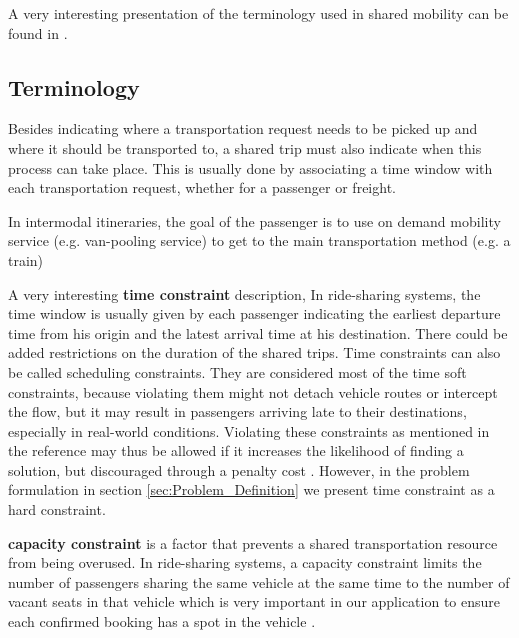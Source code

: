 \documentclass{article}
\begin{document}
A very interesting presentation of the terminology used in shared mobility can be found in\cite{hyland_taxonomy} \cite{MOURAD2019}  \cite{Schnee2009}.

\subsection{Terminology}

Besides indicating where a transportation request needs to be picked up and where it should be transported to, a shared trip must also indicate when this process can take place. 
This is usually done by associating a time window with each transportation request, whether for a passenger or freight. 

In intermodal itineraries, the goal of the passenger is to use on demand mobility service (e.g. van-pooling service) to get to the main transportation method (e.g. a train) 


A very interesting \textbf{time constraint} description, In ride-sharing systems, the time window is usually given by each passenger indicating the earliest departure time from his origin and the latest arrival time at his destination.
There could be added restrictions on the duration of the shared trips. Time constraints can also be called scheduling constraints. They are considered most of the time soft constraints, because violating them might not detach vehicle routes or intercept the flow, but it may result in passengers arriving late to their destinations, especially in real-world conditions. Violating these
constraints as mentioned in the reference may thus be allowed if it increases the likelihood of finding a solution, but discouraged through
a penalty cost \cite{MOURAD2019}. However, in the problem formulation in section \ref{sec:Problem_Definition} we present time constraint as a hard constraint.

\textbf{capacity constraint} is a factor that prevents a shared transportation resource from being overused. In ride-sharing systems, a capacity constraint limits the number of passengers sharing the same vehicle at the
same time to the number of vacant seats in that vehicle which is very important in our application to ensure each confirmed booking has a spot in the vehicle\cite{MOURAD2019} .
\end{document}
